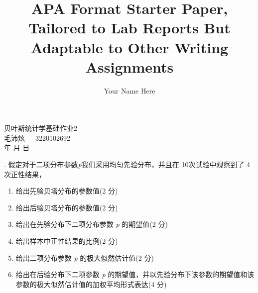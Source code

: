 \documentclass[stu,12pt,floatsintext]{apa7} %
\title{APA Format Starter Paper, Tailored to Lab Reports But Adaptable to Other Writing Assignments} %
\author{Your Name Here}
\affiliation{Your School}
\begin{document}
\begin{titlepage}
    \centering
    \vspace*{4cm} %
    \Huge
    {\heiti 贝叶斯统计学基础作业2} \\
    \vspace{1cm}
    \Large
    毛沛炫\ \ \ 3220102692 \\
    \vspace{12.3cm}
    \Large
    \number\year 年 \number\month 月 \number\day 日
    \vfill
\end{titlepage}


. {\heiti 假定对于二项分布参数\textit{p}我们采用均匀先验分布，并且在 10次试验中观察到了 4 次正性结果，}
\begin{enumerate}[itemsep=2pt,topsep=0pt,parsep=0pt,label=(\alph*)]
\item  给出先验贝塔分布的参数值(2 分)

\item  给出后验贝塔分布的参数值(2 分)
    
\item  给出在先验分布下二项分布参数 \textit{p} 的期望值(2 分)
    
\item  给出样本中正性结果的比例(2 分)
    
\item  给出二项分布参数 \textit{p} 的极大似然估计值(2 分)
    
\item  给出在后验分布下二项参数 \textit{p} 的期望值，并以先验分布下该参数的期望值和该参数的极大似然估计值的加权平均形式表达(4 分)
\end{enumerate}
\end{document}
